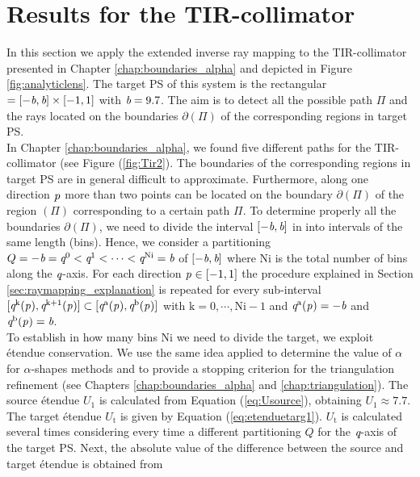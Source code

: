 \section{Results for the TIR-collimator}\label{sec:TIR}
In this section we apply the extended inverse ray mapping to the TIR-collimator presented in Chapter \ref{chap:boundaries_alpha} and depicted in Figure \ref{fig:analyticlens}. The target PS of this system is the rectangular $= [-\textit{b}, \textit{b}]\times[-1,1]$ with $\textit{b}=9.7$. The aim is to detect all the possible path $\Pi$ and the rays located on the boundaries $\partial$$(\Pi)$ of the corresponding regions in target PS. 
\\ \indent In Chapter \ref{chap:boundaries_alpha}, we found five different paths for the TIR-collimator (see Figure (\ref{fig:Tir2}). The boundaries of the corresponding regions in target PS  are in general difficult to approximate. Furthermore, along one direction $\textit{p}_{\textrm{} \textit{}}$ more than two points can be located on the boundary $\partial$$(\Pi)$ of the region $(\Pi)$ corresponding to a certain path $\Pi$. To determine properly all the boundaries 
$\partial$$(\Pi)$, we need to divide the interval $[-\textit{b}, \textit{b}]$ in 
 into intervals of the same length (bins). Hence, we consider a partitioning 
$Q = -\textit{b}=\textit{q}^{0}<\textit{q}^{1}<\cdots<\textit{q}^{\textrm{Ni}}=\textit{b}$ of $[-\textit{b}, \textit{b}]$ where $\textrm{Ni}$ is the total number of bins along the $\textit{q}$-axis.
For each direction $\textit{p}_{\textrm{} \textit{}}\in [-1,1]$ the procedure explained in Section \ref{sec:raymapping_explanation} is repeated for every sub-interval $[\textit{q}^{\textrm{k}}(\textit{p}_{\textrm{} \textit{}}), \textit{q}^{\textrm{k}+1}(\textit{p}_{\textrm{} \textit{}})]\subset [\textit{q}^{\textrm{a}}(\textit{p}_{\textrm{} \textit{}}), \textit{q}^{\textrm{b}}(\textit{p}_{\textrm{} \textit{}})]$ with $\textrm{k}=0, \cdots, \textrm{Ni}-1$ and $\textit{q}^{\textrm{a}}(\textit{p}_{\textrm{} \textit{}}) = -\textit{b}$ and $\textit{q}^{\textrm{b}}(\textit{p}_{\textrm{} \textit{}}) = \textit{b}$.\\ \indent
To establish in how many bins \textrm{Ni} we need to divide the target, we exploit \'{e}tendue conservation. We use the same idea applied to determine the value of $\alpha$ for $\alpha$-shapes methods and to provide a stopping criterion for the triangulation refinement (see Chapters \ref{chap:boundaries_alpha} and \ref{chap:triangulation}). 
The source \'{e}tendue $U_1$ is calculated from Equation (\ref{eq:Usource}), obtaining $U_1 \approx 7.7$. The target \'{e}tendue $U_\textrm{t}$ is given by Equation (\ref{eq:etenduetarg1}). $U_\textrm{t}$ is calculated several times considering every time a different partitioning $Q$ for the $\textit{q}$-axis of the target PS. Next, the absolute value of the difference between the source and target \'{e}tendue is obtained from
